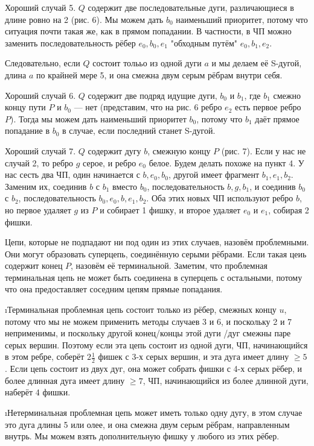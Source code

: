 \begin{proofstar}
Хороший случай 5. $Q$ содержит две последовательные дуги, различающиеся в длине ровно на 2 (рис. 6). Мы можем дать $b_0$ наименьший приоритет, потому что ситуация почти такая же, как в прямом попадании. В частности, в ЧП можно заменить последовательность рёбер $e_0, b_0, e_1$ "обходным путём" $e_0, b_1, e_2$. 

Следовательно, если $Q$ состоит толььо из одной дуги $a$ и мы делаем её S-дугой, длина $a$ по крайней мере 5, и она смежна двум серым рёбрам внутри себя.

Хороший случай 6.
$Q$ содержит две подряд идущие дуги, $b_0$ и $b_1$, где $b_1$ смежно концу пути $P$ и $b_0$ --- нет (представим, что на рис. 6 ребро $e_2$ есть первое ребро $P$). Тогда мы можем дать наименьший приоритет $b_0$, потому что $b_1$ даёт прямое попадание в $b_0$ в случае, если последний станет S-дугой.

Хороший случай 7.
$Q$ содержит дугу $b$, смежную концу $P$ (рис. 7). Если у нас не случай 2, то ребро $g$ серое, и ребро $e_0$ белое. Будем делать похоже на пункт 4. У нас сесть два ЧП, один начинается с $b, e_0, b_0$, другой имеет фрагмент $b_1, e_1, b_2$. Заменим их, соединив $b$ с $b_1$ вместо $b_0$, последовательность $b, g, b_1$, и соединив $b_0$ с $b_2$, последовательность $b_0, e_0, b, e_1, b_2$. Оба этих новых ЧП используют ребро $b$, но первое удаляет $g$ из $P$ и собирает 1 фишку, и второе удаляет $e_0$ и $e_1$, собирая 2 фишки. 

Цепи, которые не подпадают ни под один из этих случаев, назовём проблемными. Они могут образовать суперцепь, соединённую серыми рёбрами. Если такая цеиь содержит конец $P$, назовём её терминальной. Заметим, что проблемная терминальная цепь не может быть соединена в суперцепь с остальными, потому что она предоставляет соседним цепям прямые попадания.

\begin{enumerate}
\i Терминальная проблемная цепь состоит только из рёбер, смежных концу $u$, потому что мы не можем применить методы случаев 3 и 6, и поскольку 2 и 7 неприменимы, и поскольку другой конец/концы этой дуги /дуг смежны паре серых вершин. Поэтому если эта цепь состоит из одной дуги, ЧП, начинающийся в этом ребре, соберёт $2\frac{1}{2}$ фишек с 3-х серых вершин, и эта дуга имеет длину $\ge 5$. Если цепь состоит из двух дуг, она может собрать фишки с 4-х серых рёбер, и более длинная дуга имеет длину $\ge 7$, ЧП, начинающийся из более длинной дуги, наберёт 4 фишки.

\i Нетерминальная проблемная цепь может иметь только одну дугу, в этом случае это дуга длины 5 или олее, и она смежна двум серым рёбрам, направленным внутрь. Мы можем взять дополнительную фишку у любого из этих рёбер.


\end{enumerate}
\end{proofstar}
